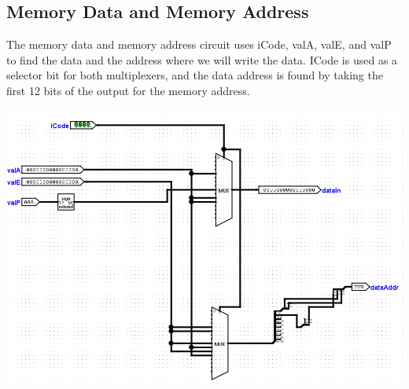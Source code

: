 \documentclass{article}
\begin{document}
\subsection{Memory Data and Memory Address}
The memory data and memory address circuit uses iCode, valA, valE, and valP to find the data and the address where we will write the data. ICode is used as a selector bit for both multiplexers, and the data address is found by taking the first 12 bits of the output for the memory address.
\begin{center}
    \includegraphics[scale=.6]{memaddrdata.png} \\
\end{center}
\pagebreak
\end{document}
